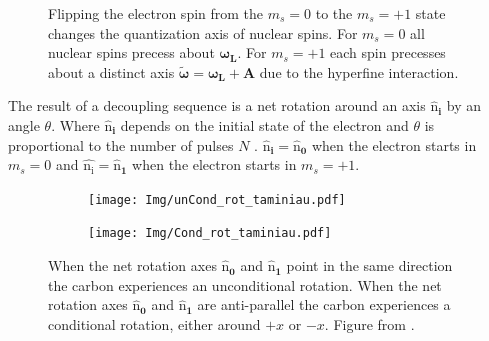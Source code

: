 \begin{figure}[htbp]
\centering

\caption{Flipping the electron spin from the  $m_s=0$ to the $m_s= +1$ state changes the quantization axis of nuclear spins. For  $m_s=0$ all nuclear spins precess about $\bm{\omega_L}$. For  $m_s=+1$ each spin precesses about a distinct axis $\bm{\tilde{\omega}}=\bm{\omega_L} +\bm{A}$ due to the hyperfine interaction.}
\label{fig:quantax}
\end{figure}

The result of a decoupling sequence is a net rotation around an axis $\bm{\hat{\mathrm{n}}_i}$ by an angle $\theta$.
Where $\bm{\hat{\mathrm{n}}_i}$ depends on the initial state of the electron and $\theta$ is proportional to the number of pulses $N$ \citep{Taminiau2012Detection}.
$\bm{\hat{\mathrm{n}}_i} =\bm{\hat{\mathrm{n}}_0}$ when the electron starts in $m_s = 0$ and $\bm{\hat{\mathrm{n_i}}} =\bm{\hat{\mathrm{n}}_1}$ when the electron starts in $m_s = +1$.

\begin{figure}[htbp]
    \begin{subfigure}[t]{0.49\textwidth}\centering
        \centering
        \caption{}
        \texttt{[image: Img/unCond\_rot\_taminiau.pdf]}
        \label{fig:uncond_rot}
    \end{subfigure}
    \begin{subfigure}[t]{0.49\textwidth}\centering
        \centering
        \caption{}
        \texttt{[image: Img/Cond\_rot\_taminiau.pdf]}
        \label{fig:cond_rot}
    \end{subfigure}
    \caption{ When the net rotation axes $\bm{\hat{\mathrm{n}}_0}$ and $\bm{\hat{\mathrm{n}}_1}$ point in the same direction the carbon experiences an unconditional rotation.  When the net rotation axes $\bm{\hat{\mathrm{n}}_0}$ and $\bm{\hat{\mathrm{n}}_1}$ are anti-parallel the carbon experiences a conditional rotation, either around $+x$ or $-x$. Figure from \citet{Taminiau2012Detection}.}
    \label{fig:conditional_and_unconditional_rotation}
\end{figure}

